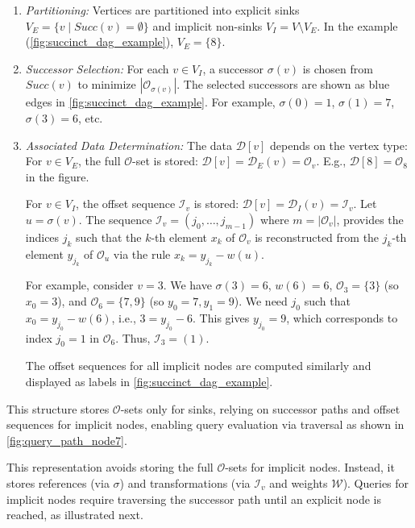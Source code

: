 \begin{enumerate}
    \item \emph{Partitioning:} Vertices are partitioned into explicit sinks $V_E = \{ v \mid Succ(v) = \emptyset \}$ and implicit non-sinks $V_I = V \setminus V_E$. In the example (\autoref{fig:succinct_dag_example}), $V_E=\{8\}$.

    \item \emph{Successor Selection:} For each $v \in V_I$, a successor $\sigma(v)$ is chosen from $Succ(v)$ to minimize $|\mathcal{O}_{\sigma(v)}|$. The selected successors are shown as blue edges in \autoref{fig:succinct_dag_example}. For example, $\sigma(0)=1$, $\sigma(1)=7$, $\sigma(3)=6$, etc.
    \item \emph{Associated Data Determination:} The data $\mathcal{D}[v]$ depends on the vertex type:
          For $v \in V_E$, the full $\mathcal{O}$-set is stored: $\mathcal{D}[v] = \mathcal{D}_E(v) = \mathcal{O}_v$. E.g., $\mathcal{D}[8] = \mathcal{O}_8$ in the figure.

          For $v \in V_I$, the offset sequence $\mathcal{I}_v$ is stored: $\mathcal{D}[v] = \mathcal{D}_I(v) = \mathcal{I}_v$. Let $u = \sigma(v)$. The sequence $\mathcal{I}_v = (j_0, \dots, j_{m-1})$ where $m=|\mathcal{O}_v|$, provides the indices $j_k$ such that the $k$-th element $x_k$ of $\mathcal{O}_v$ is reconstructed from the $j_k$-th element $y_{j_k}$ of $\mathcal{O}_u$ via the rule $x_k = y_{j_k} - w(u)$.

          For example, consider $v=3$. We have $\sigma(3)=6$, $w(6)=6$, $\mathcal{O}_3=\{3\}$ (so $x_0=3$), and $\mathcal{O}_6=\{7, 9\}$ (so $y_0=7, y_1=9$). We need $j_0$ such that $x_0 = y_{j_0} - w(6)$, i.e., $3 = y_{j_0} - 6$. This gives $y_{j_0}=9$, which corresponds to index $j_0=1$ in $\mathcal{O}_6$. Thus, $\mathcal{I}_3 = (1)$.

          The offset sequences for all implicit nodes are computed similarly and displayed as labels in \autoref{fig:succinct_dag_example}.
\end{enumerate}

This structure stores $\mathcal{O}$-sets only for sinks, relying on successor paths and offset sequences for implicit nodes, enabling query evaluation via traversal as shown in \autoref{fig:query_path_node7}.

This representation avoids storing the full $\mathcal{O}$-sets for implicit nodes. Instead, it stores references (via $\sigma$) and transformations (via $\mathcal{I}_v$ and weights $\mathcal{W}$). Queries for implicit nodes require traversing the successor path until an explicit node is reached, as illustrated next.

